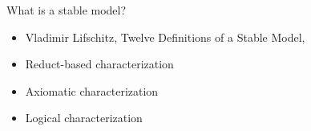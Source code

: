 \begin{frame}{What is a stable model?}
  \bigskip
  \begin{itemize}
  \item Vladimir Lifschitz, Twelve Definitions of a Stable Model,
    \cite{lifschitz08a}
    \bigskip
    \bigskip
  \item Reduct-based characterization
  \item Axiomatic characterization
  \item Logical characterization
  \end{itemize}
\end{frame}
%
